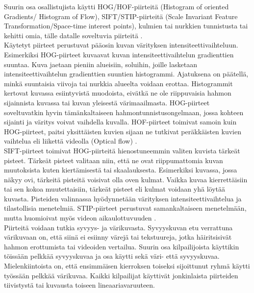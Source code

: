 Suurin osa osallistujista käytti HOG/HOF-piirteitä (Histogram of oriented Gradients/ Histogram of Flow), SIFT/STIP-piirteitä 
(Scale Invariant Feature Transformation/Space-time interest points), 
kulmien tai nurkkien tunnistusta tai kehitti omia, tälle datalle soveltuvia piirteitä .\citep {6239178}\\

Käytetyt piirteet perustuvat pääosin kuvan värityksen intensiteettivaihteluun.
Esimerkiksi HOG-piirteet kuvaavat kuvan intensiteettivaihtelun gradienttien suuntaa. Kuva jaetaan pieniin alueisiin, soluihin, 
joille lasketaan intensiteettivaihtelun gradienttien suuntien histogrammi. 
Ajatuksena on päätellä, minkä suuntaisia viivoja tai nurkkia alueelta voidaan erottaa. \citep {1467360} Histogrammit kertovat kuvassa esiintyvistä
muodoista, eivätkä ne ole riippuvaisia hahmon sijainnista kuvassa tai kuvan yleisestä värimaailmasta.
HOG-piirteet soveltuvatkin hyvin tämänkaltaiseen hahmontunnistusongelmaan, jossa kohteen sijainti ja väritys voivat vaihdella kuvalla.
HOF-piirteet toimivat samoin kuin HOG-piirteet, paitsi yksittäisten kuvien sijaan ne tutkivat peräkkäisten kuvien vaihtelua eli liikettä videolla (Optical flow) \citep{Pers20101369}.\\

SIFT-piirteet toimivat HOG-piirteitä hienostuneemmin valiten kuvista tärkeät pisteet. Tärkeät pisteet valitaan niin, että ne ovat riippumattomia
kuvan muutoksista kuten kiertämisestä tai skaalauksesta. Esimerkiksi kuvassa, jossa näkyy ovi, tärkeitä pisteitä voisivat olla oven kulmat.
Vaikka kuvaa kierrettäisiin tai sen kokoa muutettaisiin, tärkeät pisteet eli kulmat voidaan yhä löytää kuvasta.
Pisteiden valinnassa hyödynnetään värityksen intensiteettivaihtelua ja tilastollisia menetelmiä. \citep {790410}
STIP-piirteet perustuvat samankaltaiseen menetelmään, mutta huomioivat myös videon aikaulottuvuuden \citep{1238378}. \\

Piirteitä voidaan tutkia syvyys- ja värikuvasta. Syvyyskuvan etu verrattuna värikuvaan on, että siinä
ei esiinny värejä tai tekstuureja, jotka häiritsisivät hahmon erottumista tai videoiden vertailua.
Suurin osa kilpailijoista käyttikin töissään pelkkää syvyyskuvaa ja osa käytti sekä väri- että syvyyskuvaa. 
Mielenkiintoista on, että ensimmäisen kierroksen toiseksi sijoittunut ryhmä käytti työssään pelkkää värikuvaa. 
Kaikki kilpailijat käyttivät jonkinlaista piirteiden tiivistystä tai kuvausta toiseen lineaariavaruuteen. \citep {6239178}\\ 

